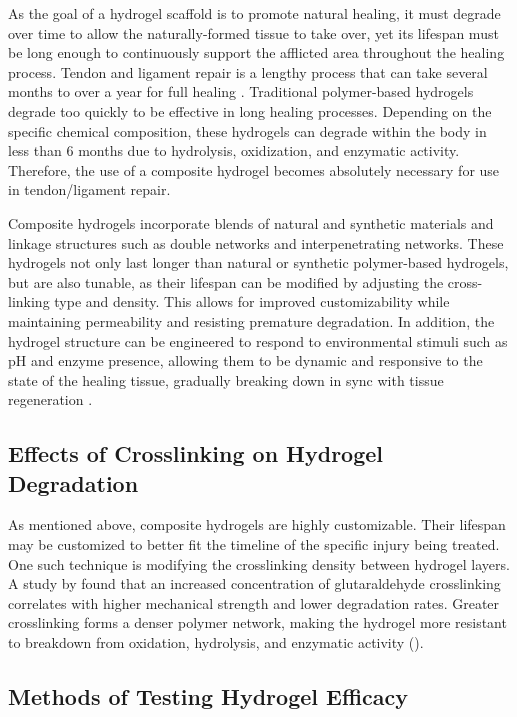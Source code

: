 As the goal of a hydrogel scaffold is to promote natural healing, it must degrade over time to
allow the naturally-formed tissue to take over, yet its lifespan must be long enough to
continuously support the afflicted area throughout the healing process. Tendon and ligament
repair is a lengthy process that can take several months to over a year for full healing \autocite{RN1}. Traditional polymer-based hydrogels degrade too quickly to be effective in long healing
processes. Depending on the specific chemical composition, these hydrogels can degrade
within the body in less than 6 months due to hydrolysis, oxidization, and enzymatic activity.
Therefore, the use of a composite hydrogel becomes absolutely necessary for use in
tendon/ligament repair.

Composite hydrogels incorporate blends of natural and synthetic materials and linkage
structures such as double networks and interpenetrating networks. These hydrogels not only
last longer than natural or synthetic polymer-based hydrogels, but are also tunable, as their
lifespan can be modified by adjusting the cross-linking type and density. This allows for
improved customizability while maintaining permeability and resisting premature degradation. In
addition, the hydrogel structure can be engineered to respond to environmental stimuli such as
pH and enzyme presence, allowing them to be dynamic and responsive to the state of the
healing tissue, gradually breaking down in sync with tissue regeneration \autocite{RN3}.

\subsection{Effects of Crosslinking on Hydrogel Degradation
}

As mentioned above, composite hydrogels are highly customizable. Their lifespan may be
customized to better fit the timeline of the specific injury being treated. One such technique is
modifying the crosslinking density between hydrogel layers. A study by \autocite{RN4} found that an
increased concentration of glutaraldehyde crosslinking correlates with higher mechanical
strength and lower degradation rates. Greater crosslinking forms a denser polymer network,
making the hydrogel more resistant to breakdown from oxidation, hydrolysis, and enzymatic
activity (\citeyear{RN4}).

\subsection{Methods of Testing Hydrogel Efficacy}


